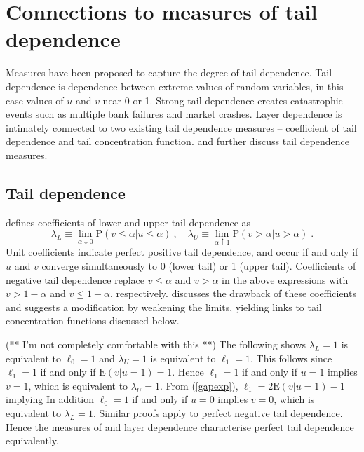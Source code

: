 \documentclass[authoryear]{elsarticle}
\newcommand{\E}{{\mathrm E}}
\newcommand{\p}{\mathrm{P}}
\newcommand{\cq}{\ ,\quad }
\newcommand{\eref}[1]{(\ref{#1})}
\begin{document}
\section{Connections to measures of tail dependence}\label{sliterature}

Measures have been proposed to capture the degree of tail dependence. Tail dependence is dependence between extreme values of random variables, in this case values of $u$ and $v$ near 0 or 1. Strong tail dependence creates catastrophic events such as  multiple bank failures and  market crashes. Layer dependence is intimately connected to two existing tail dependence measures -- coefficient of tail dependence and tail concentration function. \cite{sweeting2013calculating} and \cite{durante2014copulas} further discuss tail dependence measures.


\subsection{Tail dependence}

\cite{joe1997multivariate} defines coefficients of lower and upper tail dependence as
$$
\lambda_L \equiv \lim_{\alpha\downarrow 0} \p(v\leq \alpha |u\leq \alpha) \cq
\lambda_U \equiv \lim_{\alpha\uparrow 1} \p(v>\alpha |u>\alpha) \;.
$$
Unit coefficients indicate perfect positive tail dependence, and occur if and only if $u$ and $v$ converge simultaneously to 0 (lower tail) or 1 (upper tail). Coefficients of negative tail dependence replace $v\leq \alpha$ and $v>\alpha$ in the above expressions with $v>1-\alpha$ and $v\leq 1-\alpha$, respectively.  \cite{sweeting2013calculating} discusses the drawback of these coefficients and suggests a modification by weakening the limits, yielding links to tail concentration functions discussed below.

(** I'm not completely comfortable with this **) The following shows $\lambda_L=1$ is equivalent to $\ell_0=1$ and $\lambda_U=1$ is equivalent to $\ell_1=1$.   This follows since  $\ell_1=1$ if and only if $\E(v|u=1)=1$. Hence $\ell_1=1$ if and only if $u=1$ implies $v=1$, which is equivalent to $\lambda_U=1$.
From \eref{gapexp}, $\ell_1=2\E(v|u=1)-1$ implying In addition $\ell_0=1$ if and only if $u=0$ implies $v=0$, which is equivalent to $\lambda_L=1$. Similar proofs apply to perfect negative tail dependence.
Hence the measures of  \cite{joe1997multivariate} and layer dependence characterise perfect tail dependence equivalently.
\end{document}
